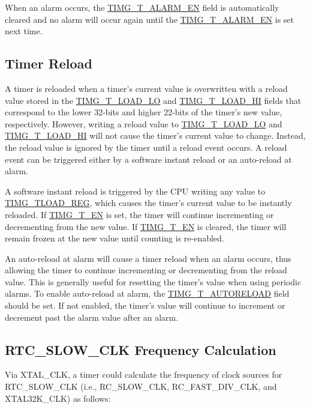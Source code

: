 \documentclass[main\_\_EN.tex]{subfiles}
\begin{document}
When an alarm occurs, the \hyperref[fielddesc:TIMGTXALARMEN]{TIMG\_T\_ALARM\_EN} field is automatically cleared and no alarm will occur again until the \hyperref[fielddesc:TIMGTXALARMEN]{TIMG\_T\_ALARM\_EN} is set next time.

\subsection{Timer Reload} \label{sec:timg-func-descr-reload}
A timer is reloaded when a timer's current value is overwritten with a reload value stored in the \hyperref[fielddesc:TIMGTXLOADLO]{TIMG\_T\_LOAD\_LO} and \hyperref[fielddesc:TIMGTXLOADHI]{TIMG\_T\_LOAD\_HI} fields that correspond to the lower 32-bits and higher 22-bits of the timer's new value, respectively. However, writing a reload value to \hyperref[fielddesc:TIMGTXLOADLO]{TIMG\_T\_LOAD\_LO} and \hyperref[fielddesc:TIMGTXLOADHI]{TIMG\_T\_LOAD\_HI} will not cause the timer's current value to change. Instead, the reload value is ignored by the timer until a reload event occurs. A reload event can be triggered either by a software instant reload or an auto-reload at alarm.

A software instant reload is triggered by the CPU writing any value to \hyperref[regdesc:TIMGTXLOADREG]{TIMG\_TLOAD\_REG}, which causes the timer's current value to be instantly reloaded. If \hyperref[fielddesc:TIMGTXEN]{TIMG\_T\_EN} is set, the timer will continue incrementing or decrementing from the new value. If \hyperref[fielddesc:TIMGTXEN]{TIMG\_T\_EN} is cleared, the timer will remain frozen at the new value until counting is re-enabled.

An auto-reload at alarm will cause a timer reload when an alarm occurs, thus allowing the timer to continue incrementing or decrementing from the reload value. This is generally useful for resetting the timer's value when using periodic alarms. To enable auto-reload at alarm, the \hyperref[fielddesc:TIMGTXAUTORELOAD]{TIMG\_T\_AUTORELOAD} field should be set. If not enabled, the timer's value will continue to increment or decrement past the alarm value after an alarm.

\subsection{RTC\_SLOW\_CLK Frequency Calculation}

Via XTAL\_CLK, a timer could calculate the frequency of clock sources for RTC\_SLOW\_CLK (i.e., RC\_SLOW\_CLK, RC\_FAST\_DIV\_CLK, and XTAL32K\_CLK) as follows:
\end{document}
